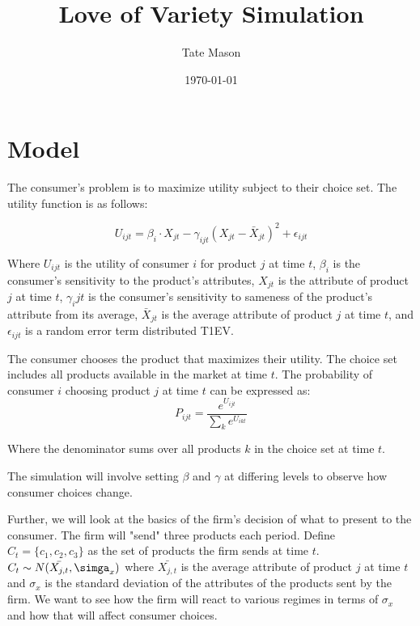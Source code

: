 \documentclass[11pt]{article}
\title{Love of Variety Simulation}
\author{Tate Mason}
\date{\today}
\theoremstyle{definition}
\theoremstyle{remark}
\begin{document}
\maketitle
\thispagestyle{empty}


\newpage
\setcounter{page}{1}

\section{Model}
The consumer's problem is to maximize utility subject to their choice set. The utility function is as follows:

\begin{equation}
  U_{ijt} = \beta_i \cdot X_{jt} - \gamma_{ijt}(X_{jt} - \bar{X}_{jt})^2 + \epsilon_{ijt}
\end{equation}

Where $U_{ijt}$ is the utility of consumer $i$ for product $j$ at time $t$, $\beta_i$ is the consumer's sensitivity to the product's attributes, $X_{jt}$ is the attribute of product $j$ at time $t$, $\gamma_ijt$ is the consumer's sensitivity to sameness of the product's attribute from its average, $\bar{X}_{jt}$ is the average attribute of product $j$ at time $t$, and $\epsilon_{ijt}$ is a random error term distributed T1EV.

The consumer chooses the product that maximizes their utility. The choice set includes all products available in the market at time $t$. The probability of consumer $i$ choosing product $j$ at time $t$ can be expressed as:
\begin{equation}
  P_{ijt} = \frac{e^{U_{ijt}}}{\sum_{k} e^{U_{ikt}}}
\end{equation}

Where the denominator sums over all products $k$ in the choice set at time $t$.

The simulation will involve setting $\beta$ and $\gamma$ at differing levels to observe how consumer choices change.

Further, we will look at the basics of the firm's decision of what to present to the consumer. The firm will "send" three products each period. Define $C_t = \{c_1, c_2, c_3\}$ as the set of products the firm sends at time $t$.
$C_t \sim N(\bar{X_{j,t}}, \simga_x)$ where $\bar{X_{j,t}}$ is the average attribute of product $j$ at time $t$ and $\sigma_x$ is the standard deviation of the attributes of the products sent by the firm. We want to 
see how the firm will react to various regimes in terms of $\sigma_x$ and how that will affect consumer choices.
\end{document}
